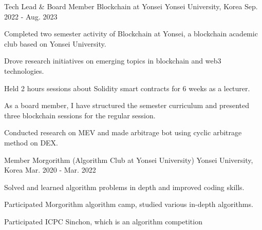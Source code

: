 \begin{cventries}
\cventry
{Tech Lead \& Board Member} %
{Blockchain at Yonsei} %
{Yonsei University, Korea} %
{Sep. 2022 - Aug. 2023} %
{ %
\begin{cvitems}
\item {Completed two semester activity of Blockchain at Yonsei, a blockchain academic club based on Yonsei University.}
\item {Drove research initiatives on emerging topics in blockchain and web3 technologies.}
\item {Held 2 hours sessions about Solidity smart contracts for 6 weeks as a lecturer.}
\item {As a board member, I have structured the semester curriculum and presented three blockchain sessions for the regular session.}
\item {Conducted research on MEV and made arbitrage bot using cyclic arbitrage method on DEX.}
\end{cvitems}
}


\cventry
{Member} %
{Morgorithm (Algorithm Club at Yonsei University)} %
{Yonsei University, Korea} %
{Mar. 2020 - Mar. 2022} %
{ %
\begin{cvitems}
\item {Solved and learned algorithm problems in depth and improved coding skills.}
\item {Participated Morgorithm algorithm camp, studied various in-depth algorithms.}
\item {Participated ICPC Sinchon, which is an algorithm competition}
\end{cvitems}
}


\end{cventries}
